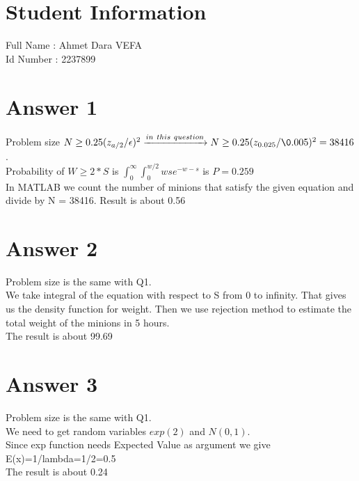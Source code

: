\documentclass[12pt]{article}
\begin{document}
\section*{Student Information } 
Full Name : Ahmet Dara VEFA \\
Id Number : 2237899 \\

\section*{Answer 1}

Problem size $N \geq 0.25 (z_{a/2}/{\epsilon})^2 \xrightarrow{in\ this\ question} N \geq 0.25 (z_{0.025}/{\0.005})^2=38416$.\\
Probability of $W \geq 2*S$ is $\int_{0}^{\infty} \int_{0}^{w/2} wse^{-w-s}$ is $P = 0.259$ \\
In MATLAB we count the number of minions that satisfy the given equation and divide by N = 38416. Result is about 0.56

\section*{Answer 2}
Problem size is the same with Q1.\\
We take integral of the equation with respect to S from 0 to infinity. That gives us the density function for weight. Then we use rejection method to estimate the total weight of the minions in 5 hours. \\
The result is about 99.69

\section*{Answer 3}

Problem size is the same with Q1.\\
We need to get random variables $exp(2)$ and $N(0,1)$.\\
Since exp function needs Expected Value as argument we give E(x)=1/lambda=1/2=0.5\\
The result is about 0.24
\end{document}
